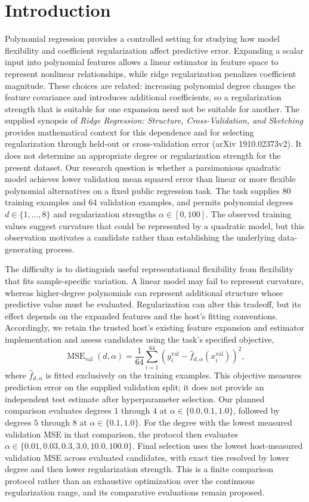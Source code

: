 \documentclass[11pt]{article}
\begin{document}
\section{Introduction}
Polynomial regression provides a controlled setting for studying how model flexibility and coefficient regularization affect predictive error. Expanding a scalar input into polynomial features allows a linear estimator in feature space to represent nonlinear relationships, while ridge regularization penalizes coefficient magnitude. These choices are related: increasing polynomial degree changes the feature covariance and introduces additional coefficients, so a regularization strength that is suitable for one expansion need not be suitable for another. The supplied synopsis of \textit{Ridge Regression: Structure, Cross-Validation, and Sketching} provides mathematical context for this dependence and for selecting regularization through held-out or cross-validation error (arXiv 1910.02373v2). It does not determine an appropriate degree or regularization strength for the present dataset. Our research question is whether a parsimonious quadratic model achieves lower validation mean squared error than linear or more flexible polynomial alternatives on a fixed public regression task. The task supplies 80 training examples and 64 validation examples, and permits polynomial degrees \(d\in\{1,\ldots,8\}\) and regularization strengths \(\alpha\in[0,100]\). The observed training values suggest curvature that could be represented by a quadratic model, but this observation motivates a candidate rather than establishing the underlying data-generating process.

The difficulty is to distinguish useful representational flexibility from flexibility that fits sample-specific variation. A linear model may fail to represent curvature, whereas higher-degree polynomials can represent additional structure whose predictive value must be evaluated. Regularization can alter this tradeoff, but its effect depends on the expanded features and the host's fitting conventions. Accordingly, we retain the trusted host's existing feature expansion and estimator implementation and assess candidates using the task's specified objective,
\[
\operatorname{MSE}_{\mathrm{val}}(d,\alpha)
=
\frac{1}{64}
\sum_{i=1}^{64}
\left(y_i^{\mathrm{val}}
-
\widehat{f}_{d,\alpha}(x_i^{\mathrm{val}})\right)^2,
\]
where \(\widehat{f}_{d,\alpha}\) is fitted exclusively on the training examples. This objective measures prediction error on the supplied validation split; it does not provide an independent test estimate after hyperparameter selection. Our planned comparison evaluates degrees \(1\) through \(4\) at \(\alpha\in\{0.0,0.1,1.0\}\), followed by degrees \(5\) through \(8\) at \(\alpha\in\{0.1,1.0\}\). For the degree with the lowest measured validation MSE in that comparison, the protocol then evaluates \(\alpha\in\{0.01,0.03,0.3,3.0,10.0,100.0\}\). Final selection uses the lowest host-measured validation MSE across evaluated candidates, with exact ties resolved by lower degree and then lower regularization strength. This is a finite comparison protocol rather than an exhaustive optimization over the continuous regularization range, and its comparative evaluations remain proposed.
\end{document}
